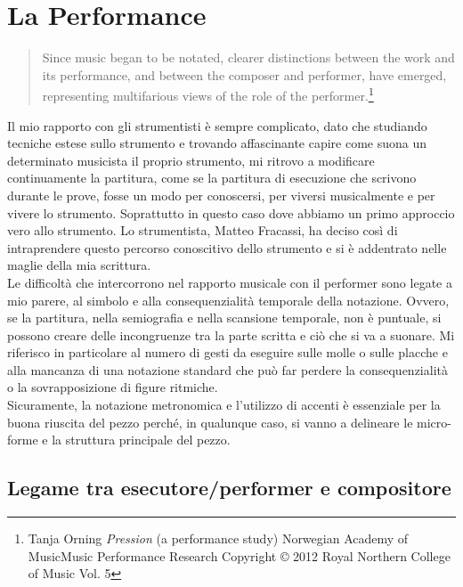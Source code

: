 
\chapter{La Performance}
\label{chp:La Performance}

\begin{quotation}
Since music began to be notated, clearer distinctions between the work and its performance, and between the composer and performer, have emerged, representing multifarious views of the role of the performer.\footnote{Tanja Orning \textit{Pression} (a performance study) Norwegian Academy of MusicMusic Performance Research Copyright © 2012 Royal Northern College of Music Vol. 5}
\end{quotation}

Il mio rapporto con gli strumentisti è sempre complicato, dato che studiando tecniche estese sullo strumento e trovando affascinante capire come suona un determinato musicista il proprio strumento, mi ritrovo a modificare continuamente la partitura, come se la partitura di esecuzione che scrivono durante le prove, fosse un modo per conoscersi, per viversi musicalmente e per vivere lo strumento. Soprattutto in questo caso dove abbiamo un primo approccio vero allo strumento. Lo strumentista, Matteo Fracassi, ha deciso così di intraprendere questo percorso conoscitivo dello strumento e si è addentrato nelle maglie della mia scrittura. \\
 Le difficoltà che intercorrono nel rapporto musicale con il performer sono legate a mio parere, al simbolo e alla consequenzialità temporale della notazione. Ovvero, se la partitura, nella semiografia e nella scansione temporale, non è puntuale, si possono creare delle incongruenze tra la parte scritta e ciò che si va a suonare. Mi riferisco in particolare al numero di gesti da eseguire sulle molle o sulle placche e alla mancanza di una notazione standard che può far perdere la consequenzialità o la sovrapposizione di figure ritmiche. \\
Sicuramente, la notazione metronomica e l'utilizzo di accenti è essenziale per la buona riuscita del pezzo perché, in qualunque caso, si vanno a delineare le micro-forme e la struttura principale del pezzo.



\section{Legame tra esecutore/performer e compositore}


